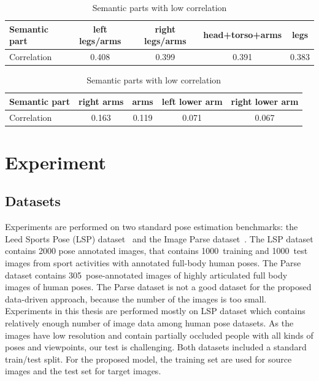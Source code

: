 \documentclass[master,english,final]{postech-ucs}
\begin{document}
\begin{table}
\begin{center}
\begin{tabular} {lcccc}
\hline
Semantic part & left legs/arms & right legs/arms & \textbf{head+torso+arms} & \textbf{legs} \\
\hline
Correlation  &  0.408 &  0.399 & 0.391 & 0.383 \\
\hline
\end{tabular}
\end{center}
\caption{Semantic parts with high correlation. Bold~:~the semantic parts used in our experiments. \newline}
\label{tab:result_semPrt_correlation_1}

\begin{center}
\begin{tabular} {lcccc}
\hline
Semantic part & right arms & arms & left lower arm & right lower arm \\
\hline
Correlation  &  0.163 &  0.119 & 0.071 & 0.067 \\
\hline
\end{tabular}
\end{center}
\caption{Semantic parts with low correlation}
\label{tab:result_semPrt_correlation_2}

\end{table}


\chapter{Experiment}

\section{Datasets}

Experiments are performed on two standard pose estimation benchmarks: the Leed Sports Pose (LSP) dataset~\cite{dataset_LSP:2010} and the Image Parse dataset~\cite{dataset_Parse:2007}.
The LSP dataset contains 2000 pose annotated images, that contains 1000~training and 1000~test images from sport activities with annotated full-body human poses. The Parse dataset contains 305~pose-annotated images of highly articulated full body images of human poses. The Parse dataset is not a good dataset for the proposed data-driven approach, because the number of the images is too small. Experiments in this thesis are performed mostly on LSP dataset which contains relatively enough number of image data among human pose datasets. As the images have low resolution and contain partially occluded people with all kinds of poses and viewpoints, our test is challenging. Both datasets included a standard train/test split. For the proposed model, the training set are used for source images and the test set for target images.
\end{document}
